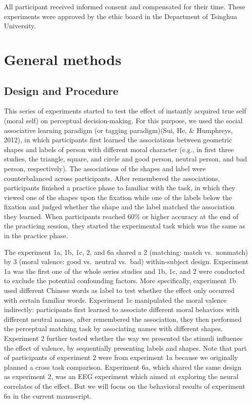 \documentclass[
  english,
  man]{apa6}
\begin{document}
All participant received informed consent and compensated for their time. These experiments were approved by the ethic board in the Department of Tsinghua University.

\hypertarget{general-methods}{%
\section{General methods}\label{general-methods}}

\hypertarget{design-and-procedure}{%
\subsection{Design and Procedure}\label{design-and-procedure}}

This series of experiments started to test the effect of instantly acquired true self (moral self) on perceptual decision-making. For this purpose, we used the social associative learning paradigm (or tagging paradigm)(Sui, He, \& Humphreys, 2012), in which participants first learned the associations between geometric shapes and labels of person with different moral character (e.g., in first three studies, the triangle, square, and circle and good person, neutral person, and bad person, respectively). The associations of the shapes and label were counterbalanced across participants. After remembered the associations, participants finished a practice phase to familiar with the task, in which they viewed one of the shapes upon the fixation while one of the labels below the fixation and judged whether the shape and the label matched the association they learned. When participants reached 60\% or higher accuracy at the end of the practicing session, they started the experimental task which was the same as in the practice phase.

The experiment 1a, 1b, 1c, 2, and 6a shared a 2 (matching: match vs.~nonmatch) by 3 (moral valence: good vs.~neutral vs.~bad) within-subject design. Experiment 1a was the first one of the whole series studies and 1b, 1c, and 2 were conducted to exclude the potential confounding factors. More specifically, experiment 1b used different Chinese words as label to test whether the effect only occurred with certain familiar words. Experiment 1c manipulated the moral valence indirectly: participants first learned to associate different moral behaviors with different neutral names, after remembered the association, they then performed the perceptual matching task by associating names with different shapes. Experiment 2 further tested whether the way we presented the stimuli influence the effect of valence, by sequentially presenting labels and shapes. Note that part of participants of experiment 2 were from experiment 1a because we originally planned a cross task comparison. Experiment 6a, which shared the same design as experiment 2, was an EEG experiment which aimed at exploring the neural correlates of the effect. But we will focus on the behavioral results of experiment 6a in the current manuscript.
\end{document}
